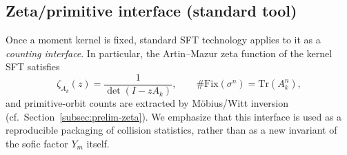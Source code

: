 \subsection{Zeta/primitive interface (standard tool)}\label{subsec:moment-zeta-interface}
Once a moment kernel is fixed, standard SFT technology applies to it as a \emph{counting interface}.
In particular, the Artin--Mazur zeta function of the kernel SFT satisfies
\[
\zeta_{A_k}(z)=\frac{1}{\det(I-zA_k)},
\qquad
\#\mathrm{Fix}(\sigma^n)=\mathrm{Tr}(A_k^n),
\]
and primitive-orbit counts are extracted by M\"obius/Witt inversion (cf.\ Section~\ref{subsec:prelim-zeta}).
We emphasize that this interface is used as a reproducible packaging of collision statistics, rather than as a new invariant of the sofic factor $Y_m$ itself.

